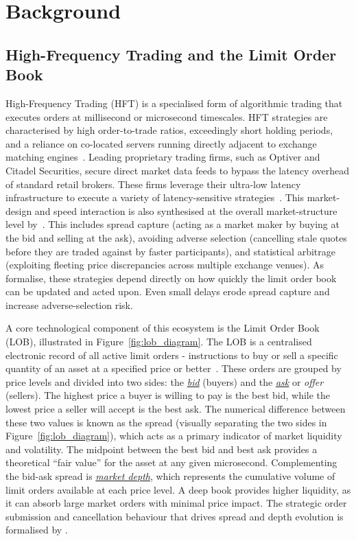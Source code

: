 \chapter{Background}
\label{chap:background}

\section{High-Frequency Trading and the Limit Order Book}

High-Frequency Trading (HFT) is a specialised form of algorithmic trading that 
executes orders at millisecond or microsecond timescales. 
HFT strategies are characterised by high order-to-trade ratios, exceedingly 
short holding periods, and a reliance on co-located servers running directly 
adjacent to exchange matching engines~\citep{aldridge2013hft}. 
Leading proprietary trading firms, such as Optiver and Citadel Securities, secure 
direct market data feeds to bypass the latency overhead of standard retail brokers. 
These firms leverage their ultra-low latency infrastructure to execute a variety 
of latency-sensitive strategies~\citep{menkveld2013hft}. 
This market-design and speed interaction is also synthesised at the overall
market-structure level by~\citet{ohara2015hfmicrostructure}.
This includes spread capture (acting as a market maker by buying at the bid and 
selling at the ask), avoiding adverse selection (cancelling stale quotes before 
they are traded against by faster participants), and statistical arbitrage 
(exploiting fleeting price discrepancies across multiple exchange venues).
As \citet{avellaneda2008hftlob} formalise, these strategies depend directly on 
how quickly the limit order book can be updated and acted upon. 
Even small delays erode spread capture and increase adverse-selection risk. 

A core technological component of this ecosystem is the Limit Order Book (LOB), 
illustrated in Figure~\ref{fig:lob_diagram}. 
The LOB is a centralised electronic record of all active limit orders - instructions 
to buy or sell a specific quantity of an asset at a specified price or 
better~\citep{gould2013lob}. 
These orders are grouped by price levels and divided into two sides: the 
\hyperref[app:glossary]{\textit{bid}} (buyers) and the \hyperref[app:glossary]{\textit{ask}} or \textit{offer} (sellers). 
The highest price a buyer is willing to pay is the best bid, while the lowest 
price a seller will accept is the best ask. 
The numerical difference between these two values is known as the spread 
(visually separating the two sides in Figure~\ref{fig:lob_diagram}), which 
acts as a primary indicator of market liquidity and volatility. 
The midpoint between the best bid and best ask provides a theoretical ``fair value'' 
for the asset at any given microsecond. 
Complementing the bid-ask spread is \hyperref[app:glossary]{\textit{market depth}}, 
which represents the cumulative volume of limit orders available at each 
price level. A deep book provides higher liquidity, as it can absorb large 
market orders with minimal price impact. The strategic order submission and 
cancellation behaviour that drives spread and depth evolution is 
formalised by \citet{rosu2009dynamiclob}.

